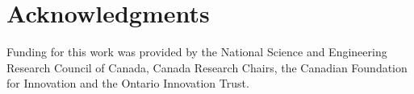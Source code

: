 \documentclass[10pt,letterpaper]{article}
\begin{document}

\section{Acknowledgments}
Funding for this work was provided by the National Science and Engineering Research Council of Canada, Canada Research Chairs, the Canadian Foundation for Innovation and the Ontario Innovation Trust.		


\setlength{\bibleftmargin}{.125in}
\setlength{\bibindent}{-\bibleftmargin}


\end{document}
